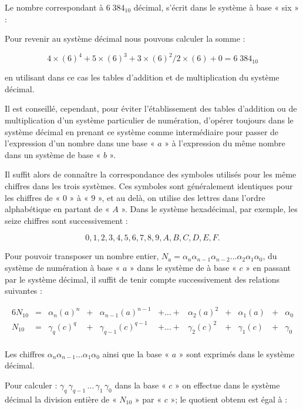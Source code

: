 Le nombre correspondant à $6\;384_{10}$ décimal, s'écrit dans le système à base « six » :

\medskip 

\centerline{  }

\medskip 

Pour revenir au système décimal nous pouvons calculer la somme : 

\[ 4 \times (6)^4 + 5 \times (6)^3 + 3 \times (6)^2 / 2 \times (6) + 0 = 6\;384_{10} \]

en utilisant dans ce cas les tables d'addition et de multiplication du système décimal.

Il est conseillé, cependant, pour éviter l'établissement des tables d'addition ou de multiplication d'un système particulier de numération, d'opérer toujours dans le système décimal en prenant ce système comme intermédiaire pour passer de l'expression d'un nombre dans une base « $a$ » à l'expression du même nombre dans un système de base « $b$ ».

Il suffit alors de connaître la correspondance des symboles utilisés   pour les même chiffres dans les trois systèmes. Ces symboles sont généralement identiques pour les chiffres de « $0$ » à « $9$ », et au delà, on utilise des lettres dans l'ordre alphabétique en partant de « $A$ ». Dans le système hexadécimal, par exemple, les seize chiffres sont successivement :

\[ 0, 1, 2, 3, 4, 5, 6 , 7, 8, 9, A, B, C, D, E, F. \] 


Pour pouvoir transposer un nombre entier, $N_a = \alpha_n \alpha_{n-1} \alpha_{n-2}\ldots \alpha_2 \alpha_1 \alpha_0$, du système de numération à base « $a$ » dans le système de à base « $c$ » en passant par le système décimal, il suffit de tenir compte successivement des relations suivantes : 

\begin{alignat*}{6} 
 N_{10} &=&  \alpha_n(a)^n &+& \alpha_{n-1}(a)^{n-1} &+  \ldots +& \alpha_2(a)^2 &+&  \alpha_1(a) &+& \alpha_0  \\
N_{10} &=& \gamma_q(c)^q &+& \gamma_{q-1}(c)^{q-1} &+  \ldots +& \gamma_2(c)^2 &+&  \gamma_1(c) &+& \gamma_0\\
\end{alignat*}

Les chiffres $\alpha_n \alpha_{n-1} \ldots  \alpha_1 \alpha_0$ ainsi que la base « $a$ » sont exprimés dans le système décimal.

Pour calculer :   $\gamma_q\, \gamma_{q-1} \,\ldots\,\gamma_1 \, \gamma_0$ dans la base « $c$ » on effectue dans le système décimal la division entière de « $N_{10}$ » par « $c$ »; le quotient obtenu est égal à : 

